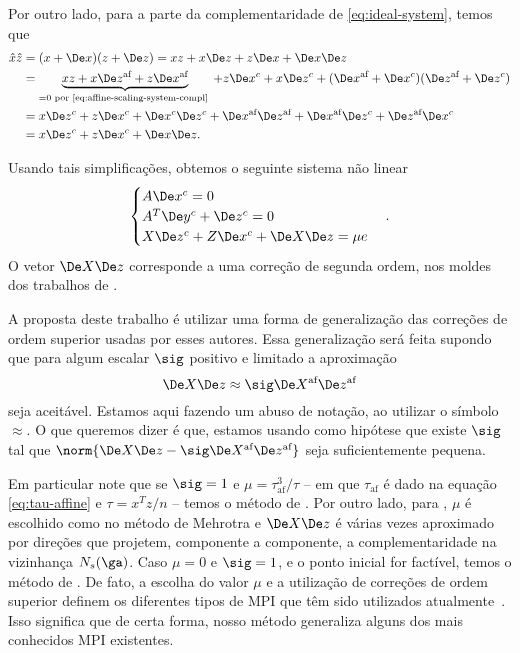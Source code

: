 Por outro lado, para a parte da complementaridade de 
\eqref{eq:ideal-system}, temos que
\begin{align*}
\hat{x}\hat{z} &= (x + \Dex)(z+\Dez) = xz + x\Dez + z\Dex + \Dex\Dez \\
                &= \underbrace{xz + x\dez + z\dex}_{=0 \text{ por
                \eqref{eq:affine-scaling-system-compl} }}  + z\Dex^c + x\Dez^c + (\dex + \Dex^c)(\dez + \Dez^c) \\
                &=  x\Dez^c  +z\Dex^c + \Dex^c\Dez^c + \dex\dez 
                + \dex\Dez^c + \dez\Dex^c \\
                &=         x\Dez^c  +z\Dex^c + \Dex\Dez.     
\end{align*}
  
Usando tais simplificações, obtemos o seguinte sistema não linear
\begin{equation}\begin{cases}
A\Dex^c =  0\\
A^T\Dey^c +\Dez^c =  0\\
X\Dez^c + Z\Dex^c + \DeX\Dez = \mu e 
\label{eq:corrector-nonlinear}
\end{cases}.
\end{equation}
O vetor $\DeX\Dez$ corresponde a uma correção de segunda ordem, nos moldes dos
trabalhos de \textcite{Mehrotra:1992wr,Gondzio:1996uw}.



A proposta deste trabalho é utilizar uma  forma de generalização das correções
de ordem superior usadas por esses autores.
Essa generalização será feita supondo que para algum escalar
$\sig$ positivo e limitado a aproximação
\begin{equation}
\label{eq:aproximacao-direcao}
\DeX\Dez \approx \sig \deX\dez
\end{equation} 
seja aceitável. Estamos aqui fazendo um abuso de notação, ao utilizar o símbolo $\approx$. O que queremos dizer é que, estamos usando como hipótese que existe $\sig$ tal que $\norm{\DeX\Dez - \sig \deX\dez}$ seja suficientemente pequena.

Em particular note
que se  $\sig = 1$ e $\mu = \tau_{\text{af}}^3/\tau$ -- em que $\tau_{\text{af}}$ é dado
na equação \eqref{eq:tau-affine} e $\tau=x^Tz/n$ -- temos o método de
\textcite{Mehrotra:1992wr}. Por outro lado, para \textcite{Gondzio:1996uw}, $\mu$ é
escolhido como no método de Mehrotra e $\DeX\Dez$ é várias vezes aproximado por
direções que projetem, componente a componente, a complementaridade na
vizinhança $N_s(\ga)$. Caso $\mu=0$ e $\sig=1$, e o ponto inicial for factível, temos o método de \textcite{Monteiro:1990vn}.
 De fato, a escolha do valor $\mu$ e a utilização de
correções de ordem superior definem os diferentes tipos de \ac{MPI} que têm sido
utilizados atualmente~\cite{Wright:Primal-dual-interior-point:1997h}. Isso significa que de certa forma, nosso método generaliza alguns dos mais conhecidos \ac{MPI} existentes.




